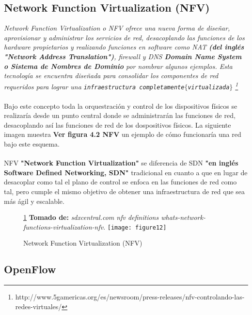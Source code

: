 \subsection{Network Function Virtualization (NFV)}

\textit{Network Function Virtualization o NFV ofrece una nueva forma de diseñar, aprovisionar y administrar los servicios de red, desacoplando las funciones de los hardware propietarios y realizando funciones en software como NAT \textbf{(del inglés "Network Address Translation")}, firewall y DNS \textbf{Domain Name System o Sistema de Nombres de Dominio} por nombrar algunos ejemplos. Esta tecnología se encuentra diseñada para consolidar los componentes de red requeridos para lograr una \texttt{infraestructura completamente$\{$virtualizada$\}$} \footnote{http://www.5gamericas.org/es/newsroom/press-releases/nfv-controlando-las-redes-virtuales/}}
\\
\\
Bajo este concepto toda la orquestración y control de los dispositivos físicos se realizaría desde un punto central donde se administrarán las funciones de red, desacoplando así las funciones de red de los dospositivos físicos. La siguiente imagen muestra \textbf{Ver figura 4.2 NFV} un ejemplo de cómo funcionaría una red bajo este esquema.
\\
\\
NFV \textbf{"Network Function Virtualization"} se diferencia de SDN \textbf{"en inglés Software Defined Networking, SDN"} tradicional en cuanto a que en lugar de desacoplar como tal el plano de control se enfoca en las funciones de red como tal, pero cumple el mismo objetivo de obtener una infraestructura de red que sea más ágil y escalable.
\begin{figure}[htbp]
 \ref{fig:nfv} \textbf{Tomado de:} \textit{sdxcentral.com nfv definitions whats-network-functions-virtualization-nfv}.
  \centering
    {\texttt{[image: figure12]}}%
  \caption{\footnotesize{Network Function Virtualization (NFV)}}
  \label{fig:nfv}
\end{figure}

\subsection{OpenFlow}
\label{sec:OpenFlow}

